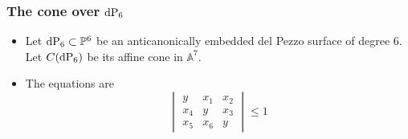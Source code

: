 \begin{frame}
\frametitle{The cone over $\dP6$}

\begin{itemize}
	\item Let $\dP6 \subset \P^6$ be an anticanonically embedded del Pezzo surface of degree $6$. Let $C(\dP6)$ be its affine cone in $\mathbb A^7$.

	\item The equations are 
	$$
\begin{vmatrix}
y & x_1 & x_2 \\
x_4 & y & x_3 \\
x_ 5 & x_6 & y
\end{vmatrix}
\leq 1
	$$
\end{itemize}

\end{frame}